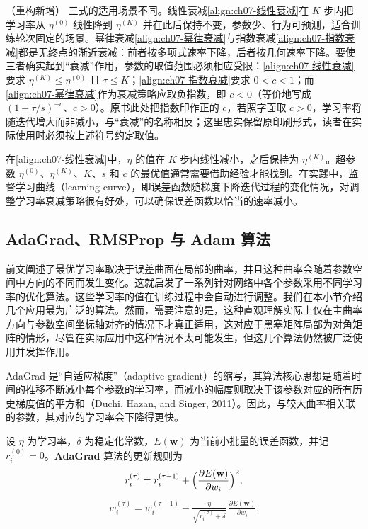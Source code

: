 \documentclass[../../main.tex]{subfiles}
\begin{document}
\begin{remark}（重构新增）
三式的适用场景不同。线性衰减\eqref{align:ch07-线性衰减}在 $K$ 步内把学习率从 $\eta^{(0)}$ 线性降到 $\eta^{(K)}$ 并在此后保持不变，参数少、行为可预测，适合训练轮次固定的场景。幂律衰减\eqref{align:ch07-幂律衰减}与指数衰减\eqref{align:ch07-指数衰减}都是无终点的渐近衰减：前者按多项式速率下降，后者按几何速率下降。要使三者确实起到“衰减”作用，参数的取值范围必须相应受限：\eqref{align:ch07-线性衰减}要求 $\eta^{(K)}\leqslant\eta^{(0)}$ 且 $\tau\leqslant K$；\eqref{align:ch07-指数衰减}要求 $0<c<1$；而\eqref{align:ch07-幂律衰减}作为衰减策略应取负指数，即 $c<0$（等价地写成 $(1+\tau/s)^{-c}$、$c>0$）。原书此处把指数印作正的 $c$，若照字面取 $c>0$，学习率将随迭代增大而非减小，与“衰减”的名称相反；这里忠实保留原印刷形式，读者在实际使用时必须按上述符号约定取值。
\end{remark}

在\eqref{align:ch07-线性衰减}中，$\eta$ 的值在 $K$ 步内线性减小，之后保持为 $\eta^{(K)}$。超参数 $\eta^{(0)}$、$\eta^{(K)}$、$K$、$s$ 和 $c$ 的最优值通常需要借助经验才能找到。在实践中，监督学习曲线（learning curve），即误差函数随梯度下降迭代过程的变化情况，对调整学习率衰减策略很有好处，可以确保误差函数以恰当的速率减小。

\subsection{AdaGrad、RMSProp 与 Adam 算法}\label{subsection:ch07-自适应学习率}

前文阐述了最优学习率取决于误差曲面在局部的曲率，并且这种曲率会随着参数空间中方向的不同而发生变化。这就启发了一系列针对网络中各个参数采用不同学习率的优化算法。这些学习率的值在训练过程中会自动进行调整。我们在本小节介绍几个应用最为广泛的算法。然而，需要注意的是，这种直观理解实际上仅在主曲率方向与参数空间坐标轴对齐的情况下才真正适用，这对应于黑塞矩阵局部为对角矩阵的情形，尽管在实际应用中这种情况不太可能发生，但这几个算法仍然被广泛使用并发挥作用。

AdaGrad 是“自适应梯度”（adaptive gradient）的缩写，其算法核心思想是随着时间的推移不断减小每个参数的学习率，而减小的幅度则取决于该参数对应的所有历史梯度值的平方和（Duchi, Hazan, and Singer, 2011）。因此，与较大曲率相关联的参数，其对应的学习率会下降得更快。

\begin{definition}[AdaGrad]\label{definition:ch07-AdaGrad}
设 $\eta$ 为学习率，$\delta$ 为稳定化常数，$E(\mathbf{w})$ 为当前小批量的误差函数，并记 $r_i^{(0)}=0$。\textbf{AdaGrad} 算法的更新规则为
\begin{align}
r_i^{(\tau)} = r_i^{(\tau-1)}+\Bigl(\frac{\partial E(\mathbf{w})}{\partial w_i}\Bigr)^{2},
\label{align:ch07-adagrad}
\end{align}
\begin{align}
w_i^{(\tau)} = w_i^{(\tau-1)}-\frac{\eta}{\sqrt{r_i^{(\tau)}+\delta}}\,\frac{\partial E(\mathbf{w})}{\partial w_i}.
\label{align:ch07-adagrad更新}
\end{align}
\end{definition}
\end{document}
